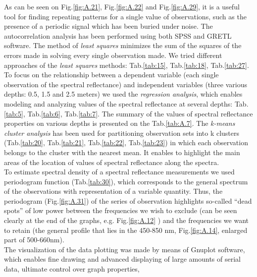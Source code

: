 \documentclass[11pt]{article}
\begin{document}
As can be seen on Fig.\ref{fig:A.21}\label{A-23}, Fig.\ref{fig:A.22}\label{A-24} and Fig.\ref{fig:A.29}, it is a useful tool for finding repeating patterns for a single value of observations, such as the presence of a periodic signal which has been buried under noise. The autocorrelation analysis has been performed using both \ac{SPSS} and \ac{GRETL} software. 
The method of \textit{least squares} minimizes the sum of the squares of the errors made in solving every single observation made. We tried different approaches of the \textit{least squares} methods: Tab.\ref{tab:15}, Tab.\ref{tab:18}, Tab.\ref{tab:27}.\\
To focus on the relationship between a dependent variable (each single observation of the spectral reflectance) and independent variables (three various depths: 0.5, 1.5 and 2.5 meters) we used the \textit{regression analysis}, which enables modeling and analyzing values of the spectral reflectance at several depths: Tab.\ref{tab:5}, Tab.\ref{tab:6}, Tab.\ref{tab:7}. 
The summary of the values of spectral reflectance properties on various depths is presented on the Tab.\ref{tab:A.7}.
The \textit{k-means cluster analysis} has been used for partitioning observation sets into k clusters (Tab.\ref{tab:20}, Tab.\ref{tab:21}, Tab.\ref{tab:22}, Tab.\ref{tab:23}) in which each observation belongs to the cluster with the nearest mean.
It enables to highlight the main areas of the location of values of spectral reflectance along the spectra.\\
To estimate spectral density of a spectral reflectance measurements we used periodogram function (Tab.\ref{tab:30}), which corresponds to the general spectrum of the observations with representation of a variable quantity.  
Thus, the periodogram (Fig.\ref{fig:A.31}) of the series of observation highlights so-called “dead spots” of low power between the frequencies we wish to exclude (can be seen clearly at the end of the graphs, e.g. Fig.\ref{fig:A.12} ) 
and the frequencies we want to retain (the general profile that lies in the 450-850 nm, Fig.\ref{fig:A.14}, enlarged part of 500-660nm).\\
The visualization of the data plotting was made by means of Gnuplot software, which enables fine
drawing and advanced displaying of large amounts of serial data, ultimate control over graph properties, 
\end{document}
